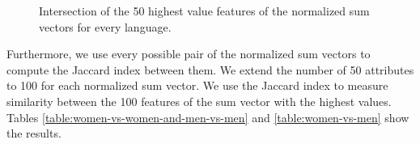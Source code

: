 \documentclass[runningheads]{llncs}
\begin{document}

\begin{figure}[h]
\centering
{}
\caption{Intersection of the 50 highest value features of the normalized sum vectors for every language.}
\label{img-vgg16-freqs}
\end{figure}

Furthermore, we use every possible pair of the normalized sum vectors
to compute the Jaccard index between 
them. We extend the number of 50 attributes to 100 for
each normalized sum vector. We use the Jaccard index to measure similarity between the
100 features of the sum vector with the highest values. Tables \ref{table:women-vs-women-and-men-vs-men} and \ref{table:women-vs-men} show
the results.
\end{document}
